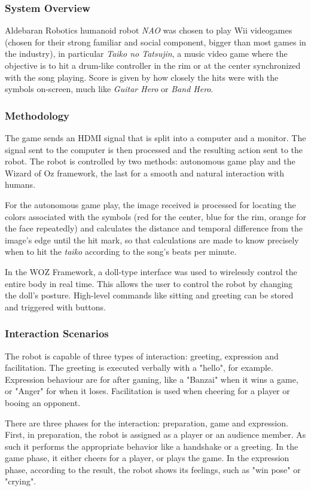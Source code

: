 \documentclass[runningheads]{llncs}
\begin{document}
\subsubsection{System Overview}
\par Aldebaran Robotics humanoid robot \textit{NAO} was chosen to play Wii videogames (chosen for their strong familiar and social component, bigger than most games in the industry), in particular \textit{Taiko no Tatsujin}, a music video game where the objective is to hit a drum-like controller in the rim or at the center synchronized with the song playing. Score is given by how closely the hits were with the symbols on-screen, much like \textit{Guitar Hero} or \textit{Band Hero}.

\subsubsection{Methodology}
\par The game sends an HDMI signal that is split into a computer and a monitor. The signal sent to the computer is then processed and the resulting action sent to the robot. The robot is controlled by two methods: autonomous game play and the Wizard of Oz framework, the last for a smooth and natural interaction with humans.
\par For the autonomous game play, the image received is processed for locating the colors associated with the symbols (red for the center, blue for the rim, orange for the face repeatedly) and calculates the distance and temporal difference from the image's edge until the hit mark, so that calculations are made to know precisely when to hit the \textit{taiko} according to the song's beats per minute.
\par In the WOZ Framework, a doll-type interface was used to wirelessly control the entire body in real time. This allows the user to control the robot by changing the doll's posture. High-level commands like sitting and greeting can be stored and triggered with buttons.

\subsubsection{Interaction Scenarios}
\par The robot is capable of three types of interaction: greeting, expression and facilitation. The greeting is executed verbally with a "hello", for example. Expression behaviour are for after gaming, like a "Banzai" when it wins a game, or "Anger" for when it loses. Facilitation is used when cheering for a player or booing an opponent.
\par There are three phases for the interaction: preparation, game and expression. First, in preparation, the robot is assigned as a player or an audience member. As such it performs the appropriate behavior like a handshake or a greeting. In the game phase, it either cheers for a player, or plays the game. In the expression phase, according to the result, the robot shows its feelings, such as "win pose" or "crying".
\end{document}
